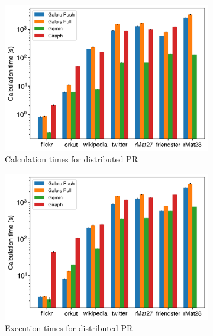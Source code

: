 \begin{figure}
	\begin{subfigure}{0.3\textwidth}
		\includegraphics[width=\linewidth]{../../plots/distributedPR_calcTime.png}
		\caption{Calculation times for distributed PR}
		\label{fig:distributedPR_calc}
	\end{subfigure}
	\hfil
	\begin{subfigure}{0.3\textwidth}
		\includegraphics[width=\linewidth]{../../plots/distributedPR_execTime.png}
		\caption{Execution times for distributed PR}
		\label{fig:distributedPR_exec}
	\end{subfigure}
	\hfil
	\begin{subfigure}{0.3\textwidth}

\end{subfigure}
\end{figure}
